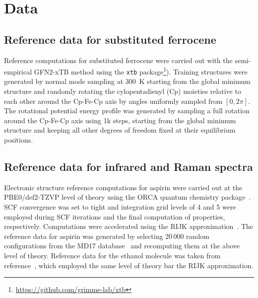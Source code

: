 \documentclass[reprint,
amsmath,amssymb,
 aip,jcp
]{revtex4-2}
\begin{document}


\renewcommand{\thefigure}{\arabic{figure}}
\renewcommand{\thetable}{\arabic{table}}
\renewcommand{\figurename}{Supplementary Figure}
\renewcommand{\tablename}{Supplementary Table}
\captionsetup[figure]{justification=raggedright}
\captionsetup[table]{justification=raggedright}
\clearpage
\appendix

\section{Data}

\subsection{Reference data for substituted ferrocene}

Reference computations for substituted ferrocene were carried out with the semi-empirical GFN2-xTB method\cite{bannwarth2019gfn2} using the \texttt{xtb} package\footnote{\url{https://github.com/grimme-lab/xtb}}). Training structures were generated by normal mode sampling\cite{smith2017ani} at 300~K starting from the global minimum structure and randomly rotating the cylopentadienyl (Cp) moieties relative to each other around the Cp-Fe-Cp axis by angles uniformly sampled from $[0,2\pi]$. The rotational potential energy profile was generated by sampling a full rotation around the Cp-Fe-Cp axis using 1k steps, starting from the global minimum structure and keeping all other degrees of freedom fixed at their equilibrium positions.

\subsection{Reference data for infrared and Raman spectra}

Electronic structure reference computations for aspirin were carried out at the PBE0/def2-TZVP\cite{adamo1999toward,Weigend2005PCCP} level of theory using the ORCA quantum chemistry package~\cite{Neese2012WCMS}.
SCF convergence was set to tight and integration grid levels of 4 and 5 were employed during SCF iterations and the final computation of properties, respectively.
Computations were accelerated using the RIJK approximation~\cite{weigend2002fully}.
The reference data for aspirin was generated by selecting 20\,000 random configurations from the MD17 database~\cite{chmiela2017machine} and recomputing them at the above level of theory.
Reference data for the ethanol molecule was taken from reference~\cite{gastegger2020machine}, which employed the same level of theory bar the RIJK approximation.
\end{document}
